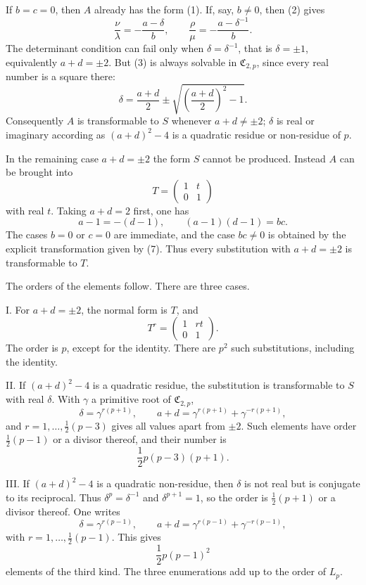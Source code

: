 \documentclass[11pt]{article}
\providecommand{\mat}[4]{\begin{pmatrix}#1&#2\\#3&#4\end{pmatrix}}
\providecommand{\mat}[4]{\begin{pmatrix}#1&#2\\#3&#4\end{pmatrix}}
\providecommand{\Cfield}{\mathfrak C}
\begin{document}
If $b=c=0$, then $A$ already has the form (1). If, say, $b\ne0$, then (2) gives
\begin{equation}
 \frac{\nu}{\lambda}=-\frac{a-\delta}{b},\qquad
 \frac{\rho}{\mu}=-\frac{a-\delta^{-1}}{b}.
 \tag{4}
\end{equation}
The determinant condition can fail only when $\delta=\delta^{-1}$, that is $\delta=\pm1$, equivalently $a+d=\pm2$. But (3) is always solvable in $\Cfield_{2,p}$, since every real number is a square there:
\begin{equation}
 \delta=\frac{a+d}{2}\pm \sqrt{\left(\frac{a+d}{2}\right)^2-1}.
 \tag{5}
\end{equation}
Consequently $A$ is transformable to $S$ whenever $a+d\ne\pm2$; $\delta$ is real or imaginary according as $(a+d)^2-4$ is a quadratic residue or non-residue of $p$.

In the remaining case $a+d=\pm2$ the form $S$ cannot be produced. Instead $A$ can be brought into
\begin{equation}
 T=\mat{1}{t}{0}{1}
 \tag{6}
\end{equation}
with real $t$. Taking $a+d=2$ first, one has
\begin{equation}
 a-1=-(d-1),\qquad (a-1)(d-1)=bc.
 \tag{7}
\end{equation}
The cases $b=0$ or $c=0$ are immediate, and the case $bc\ne0$ is obtained by the explicit transformation given by (7). Thus every substitution with $a+d=\pm2$ is transformable to $T$.

The orders of the elements follow. There are three cases.

I. For $a+d=\pm2$, the normal form is $T$, and
\[
 T^r=\mat{1}{rt}{0}{1}.
\]
The order is $p$, except for the identity. There are $p^2$ such substitutions, including the identity.

II. If $(a+d)^2-4$ is a quadratic residue, the substitution is transformable to $S$ with real $\delta$. With $\gamma$ a primitive root of $\Cfield_{2,p}$,
\begin{equation}
 \delta=\gamma^{r(p+1)},\qquad
 a+d=\gamma^{r(p+1)}+\gamma^{-r(p+1)},
 \tag{8}
\end{equation}
and $r=1,\ldots,\frac12(p-3)$ gives all values apart from $\pm2$. Such elements have order $\frac12(p-1)$ or a divisor thereof, and their number is
\[
 \frac12p(p-3)(p+1).
\]

III. If $(a+d)^2-4$ is a quadratic non-residue, then $\delta$ is not real but is conjugate to its reciprocal. Thus $\delta^p=\delta^{-1}$ and $\delta^{p+1}=1$, so the order is $\frac12(p+1)$ or a divisor thereof. One writes
\begin{equation}
 \delta=\gamma^{r(p-1)},\qquad
 a+d=\gamma^{r(p-1)}+\gamma^{-r(p-1)},
 \tag{9}
\end{equation}
with $r=1,\ldots,\frac12(p-1)$. This gives
\[
 \frac12p(p-1)^2
\]
elements of the third kind. The three enumerations add up to the order of $L_p$.
\end{document}
